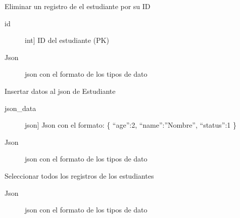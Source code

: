 \documentclass[a4paper,10pt,english]{sphinxmanual}
\begin{document}
\begin{fulllineitems}
\label{\detokenize{index:api3.student_api.controller.delete_student}}
\sphinxAtStartPar
Eliminar un registro de el estudiante por su ID
\begin{description}
\item[{id}] \leavevmode{[}int{]}
\sphinxAtStartPar
ID del estudiante (PK)

\end{description}
\begin{description}
\item[{Json}] \leavevmode
\sphinxAtStartPar
json con el formato de los tipos de dato

\end{description}

\end{fulllineitems}


\begin{fulllineitems}
\label{\detokenize{index:api3.student_api.controller.insert_student}}
\sphinxAtStartPar
Insertar datos al json de Estudiante
\begin{description}
\item[{json\_data}] \leavevmode{[}json{]}
\sphinxAtStartPar
Json con el formato: \{ “age”:2, “name”:”Nombre”, “status”:1 \}

\end{description}
\begin{description}
\item[{Json}] \leavevmode
\sphinxAtStartPar
json con el formato de los tipos de dato

\end{description}

\end{fulllineitems}


\begin{fulllineitems}
\label{\detokenize{index:api3.student_api.controller.select_all_student}}
\sphinxAtStartPar
Seleccionar todos los registros de los estudiantes
\begin{description}
\item[{Json}] \leavevmode
\sphinxAtStartPar
json con el formato de los tipos de dato

\end{description}

\end{fulllineitems}
\end{document}
